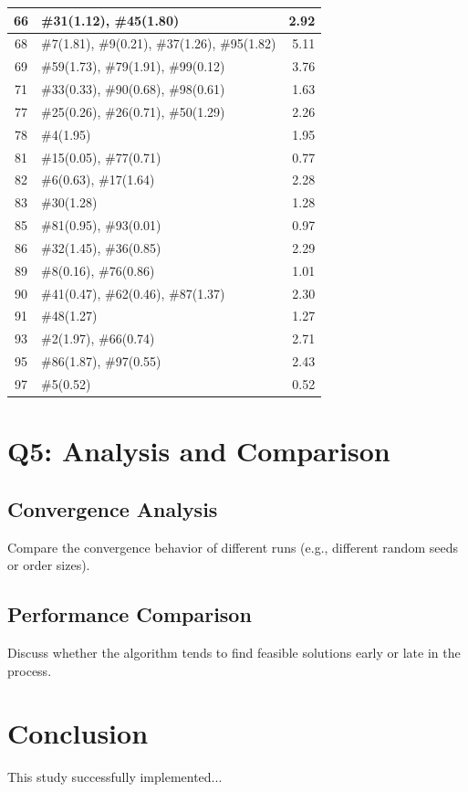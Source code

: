 \documentclass[journal,12pt,onecolumn]{IEEEtran}
\begin{document}
\begin{table}[htbp!]
\begin{tabular}{|c|l|r|}
\hline
66 & \#31(1.12), \#45(1.80) & 2.92 \\
\hline
68 & \#7(1.81), \#9(0.21), \#37(1.26), \#95(1.82) & 5.11 \\
\hline
69 & \#59(1.73), \#79(1.91), \#99(0.12) & 3.76 \\
\hline
71 & \#33(0.33), \#90(0.68), \#98(0.61) & 1.63 \\
\hline
77 & \#25(0.26), \#26(0.71), \#50(1.29) & 2.26 \\
\hline
78 & \#4(1.95) & 1.95 \\
\hline
81 & \#15(0.05), \#77(0.71) & 0.77 \\
\hline
82 & \#6(0.63), \#17(1.64) & 2.28 \\
\hline
83 & \#30(1.28) & 1.28 \\
\hline
85 & \#81(0.95), \#93(0.01) & 0.97 \\
\hline
86 & \#32(1.45), \#36(0.85) & 2.29 \\
\hline
89 & \#8(0.16), \#76(0.86) & 1.01 \\
\hline
90 & \#41(0.47), \#62(0.46), \#87(1.37) & 2.30 \\
\hline
91 & \#48(1.27) & 1.27 \\
\hline
93 & \#2(1.97), \#66(0.74) & 2.71 \\
\hline
95 & \#86(1.87), \#97(0.55) & 2.43 \\
\hline
97 & \#5(0.52) & 0.52 \\
\hline
\end{tabular}
\end{table}

\section{Q5: Analysis and Comparison}

\subsection{Convergence Analysis}

Compare the convergence behavior of different runs (e.g., different random seeds or order sizes).

\subsection{Performance Comparison}

Discuss whether the algorithm tends to find feasible solutions early or late in the process.

\section{Conclusion}
This study successfully implemented...
\end{document}
